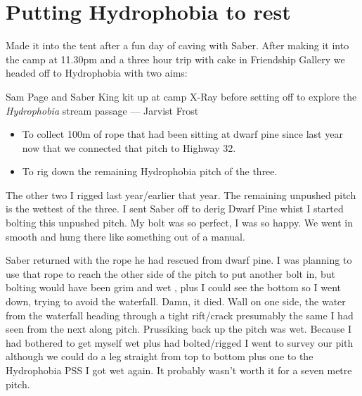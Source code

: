 \begin{marginfigure}
\end{marginfigure}

\section{Putting Hydrophobia to rest}

Made it into the tent after a fun day of caving with Saber. After making it into the camp at 11.30pm and a three hour trip with cake in Friendship Gallery we headed off to Hydrophobia  with two aims: 

\begin{marginfigure}
\centering
{}
\label{Will at camp}
\caption{Sam Page and Saber King kit up at camp X-Ray before setting off to explore the \emph{Hydrophobia} stream passage --- Jarvist Frost}
\end{marginfigure}


\begin{itemize} 
 \item To collect 100m of rope that had been sitting at dwarf pine since last year now that we connected that pitch to Highway 32.  
 \item To rig down the remaining Hydrophobia pitch of the three. 
 \end{itemize}
 
 The other two I rigged last year/earlier that year.  The remaining unpushed pitch is the wettest of the three. I sent Saber off to derig Dwarf Pine whist I started bolting this unpushed pitch. My bolt was so perfect, I was so happy. We went in smooth and hung there like something out of a manual. 

Saber returned with the rope he had rescued from dwarf pine.  I was planning to use that rope to reach the other side of the pitch  to put another bolt in, but bolting would have been grim and wet , plus I could see the bottom so I went down, trying to avoid the waterfall. Damn, it died. Wall on one side, the water from the waterfall heading through a tight rift/crack presumably the same I had seen from the next along pitch. Prussiking back up the pitch was wet. Because I had bothered to get myself wet plus had bolted/rigged I went to survey our pith although we could do a leg straight from top to bottom plus one to the Hydrophobia PSS I got wet again. It probably wasn’t worth it for a seven metre pitch.

